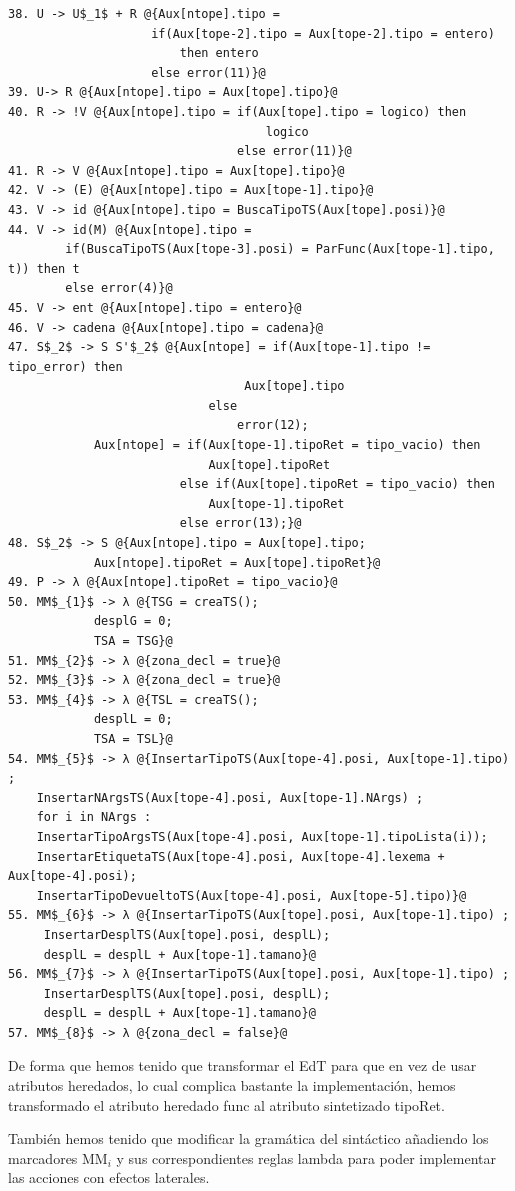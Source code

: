 \documentclass[a4paper, 12pt]{article}
\begin{document}
\begin{lstlisting}[style=EdT]
38. U -> U$_1$ + R @{Aux[ntope].tipo = 
					if(Aux[tope-2].tipo = Aux[tope-2].tipo = entero)
						then entero 
					else error(11)}@
39. U-> R @{Aux[ntope].tipo = Aux[tope].tipo}@
40. R -> !V @{Aux[ntope].tipo = if(Aux[tope].tipo = logico) then 
									logico
             					else error(11)}@
41. R -> V @{Aux[ntope].tipo = Aux[tope].tipo}@
42. V -> (E) @{Aux[ntope].tipo = Aux[tope-1].tipo}@
43. V -> id @{Aux[ntope].tipo = BuscaTipoTS(Aux[tope].posi)}@
44. V -> id(M) @{Aux[ntope].tipo = 
		if(BuscaTipoTS(Aux[tope-3].posi) = ParFunc(Aux[tope-1].tipo, t)) then t
		else error(4)}@
45. V -> ent @{Aux[ntope].tipo = entero}@
46. V -> cadena @{Aux[ntope].tipo = cadena}@
47. S$_2$ -> S S'$_2$ @{Aux[ntope] = if(Aux[tope-1].tipo != tipo_error) then
								 Aux[tope].tipo
							else 
								error(12);
			Aux[ntope] = if(Aux[tope-1].tipoRet = tipo_vacio) then 
							Aux[tope].tipoRet
						else if(Aux[tope].tipoRet = tipo_vacio) then 
							Aux[tope-1].tipoRet 
						else error(13);}@
48. S$_2$ -> S @{Aux[ntope].tipo = Aux[tope].tipo;
			Aux[ntope].tipoRet = Aux[tope].tipoRet}@
49. P -> λ @{Aux[ntope].tipoRet = tipo_vacio}@
50. MM$_{1}$ -> λ @{TSG = creaTS();
			desplG = 0;
			TSA = TSG}@
51. MM$_{2}$ -> λ @{zona_decl = true}@
52. MM$_{3}$ -> λ @{zona_decl = true}@
53. MM$_{4}$ -> λ @{TSL = creaTS();
			desplL = 0;
			TSA = TSL}@
54. MM$_{5}$ -> λ @{InsertarTipoTS(Aux[tope-4].posi, Aux[tope-1].tipo) ;
	InsertarNArgsTS(Aux[tope-4].posi, Aux[tope-1].NArgs) ;
	for i in NArgs :
	InsertarTipoArgsTS(Aux[tope-4].posi, Aux[tope-1].tipoLista(i));
	InsertarEtiquetaTS(Aux[tope-4].posi, Aux[tope-4].lexema + Aux[tope-4].posi); 
	InsertarTipoDevueltoTS(Aux[tope-4].posi, Aux[tope-5].tipo)}@
55. MM$_{6}$ -> λ @{InsertarTipoTS(Aux[tope].posi, Aux[tope-1].tipo) ;
     InsertarDesplTS(Aux[tope].posi, desplL);
     desplL = desplL + Aux[tope-1].tamano}@
56. MM$_{7}$ -> λ @{InsertarTipoTS(Aux[tope].posi, Aux[tope-1].tipo) ;
     InsertarDesplTS(Aux[tope].posi, desplL);
     desplL = desplL + Aux[tope-1].tamano}@
57. MM$_{8}$ -> λ @{zona_decl = false}@
\end{lstlisting}
\newpage
De forma que hemos tenido que transformar el EdT para que en vez de usar atributos heredados, lo cual complica bastante la implementación, hemos transformado el atributo heredado func al atributo sintetizado tipoRet.

También hemos tenido que modificar la gramática del sintáctico añadiendo los marcadores MM$_i$ y sus correspondientes reglas lambda para poder implementar las acciones con efectos laterales.
\end{document}
